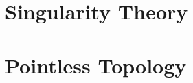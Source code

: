 \section{Singularity Theory}\label{sec:singularity_theory}



\section{Pointless Topology}\label{sec:pointless_topology}
